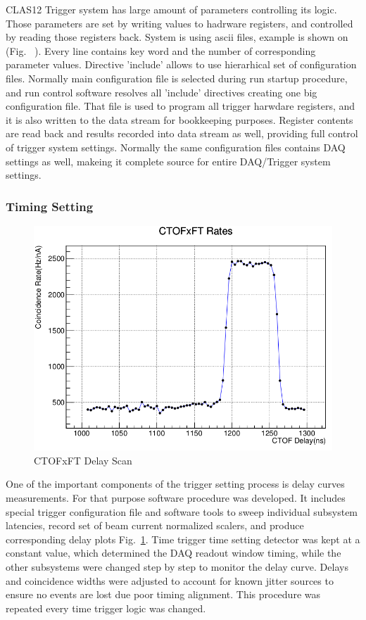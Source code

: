 CLAS12 Trigger system has large amount of parameters controlling its logic. Those parameters are set by writing values to hadrware registers, and controlled by reading those registers back. System is using ascii files, example is shown on (Fig. ~). Every line contains key word and the number of corresponding parameter values. Directive 'include' allows to use hierarhical set of configuration files. Normally main configuration file is selected during run startup procedure, and run control software resolves all 'include' directives creating one big configuration file. That file is used to program all trigger harwdare registers, and it is also written to the data stream for bookkeeping purposes. Register contents are read back and results recorded into data stream as well, providing full control of trigger system settings. Normally the same configuration files contains DAQ settings as well, makeing it complete source for entire DAQ/Trigger system settings.


\subsubsection{Timing Setting}

\begin{figure}[hbt]
	\centering
	\includegraphics[width=1.0\columnwidth,keepaspectratio]{img/delay_scan_ctof_ft.png}
	\caption{CTOFxFT Delay Scan}
	\label{fig:delay_scan_ctof_ft}
\end{figure}

One of the important components of the trigger setting process is delay curves measurements. For that purpose software procedure was developed. It includes special trigger configuration file and software tools to sweep individual subsystem latencies, record set of beam current normalized scalers, and produce corresponding delay plots Fig.~\ref{fig:delay_scan_ctof_ft}. Time trigger time setting detector was kept at a constant value, which determined the DAQ readout window timing, while the other subsystems were changed step by step to monitor the delay curve. Delays and coincidence widths were adjusted to account for known jitter sources to ensure no events are lost due poor timing alignment. This procedure was repeated every time trigger logic was changed.


